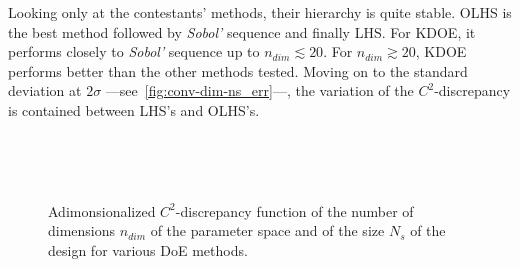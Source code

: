 Looking only at the contestants' methods, their hierarchy is quite stable. OLHS is the best method followed by \emph{Sobol'} sequence and finally LHS. For KDOE, it performs closely to \emph{Sobol'} sequence up to $n_{dim} \lesssim 20$. For $n_{dim} \gtrsim 20$, KDOE performs better than the other methods tested. Moving on to the standard deviation at $2\sigma$ ---\thinspace see~\cref{fig:conv-dim-ns_err}\thinspace---, the variation of the $C^2$-discrepancy is contained between LHS’s and OLHS’s.

\newpage
\begin{figure}[!h]               
\centering
{}
 ~       

 ~       
\caption{Adimonsionalized $C^2$-discrepancy function of the number of dimensions $n_{dim}$ of the parameter space and of the size $N_s$ of the design for various DoE methods.}
\label{fig:conv-dim-ns}
\end{figure}
